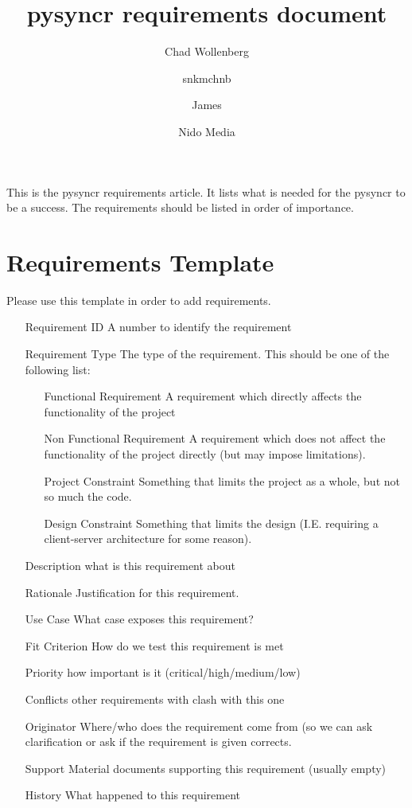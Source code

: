 \documentclass{article}
\author{Chad Wollenberg \and snkmchnb \and James \and Nido Media}
\title{pysyncr requirements document}
\begin{document}
\maketitle

\abstract

This is the pysyncr requirements article. It lists what is needed for
the pysyncr to be a success. The requirements should be listed in order
of importance.

\section{Requirements Template}

  Please use this template in order to add requirements.

  \begin{itemize}
    \item[Requirement ID] A number to identify the requirement
    \item[Requirement Type] The type of the requirement. This should be
    one of the following list:
    \begin{itemize}
      \item[Functional Requirement] A requirement which directly affects
      the functionality of the project
      \item[Non Functional Requirement] A requirement which does not
      affect the functionality of the project directly (but may impose
      limitations).
      \item[Project Constraint] Something that limits the project as a
      whole, but not so much the code.
      \item[Design Constraint] Something that limits the design (I.E.
      requiring a client-server architecture for some reason).
    \end{itemize}
    \item[Description] what is this requirement about
    \item[Rationale] Justification for this requirement.
    \item[Use Case] What case exposes this requirement?
    \item[Fit Criterion] How do we test this requirement is met
    \item[Priority] how important is it (critical/high/medium/low)
    \item[Conflicts] other requirements with clash with this one
    \item[Originator] Where/who does the requirement come from (so we can
    ask clarification or ask if the requirement is given corrects.
    \item[Support Material] documents supporting this requirement (usually empty)
    \item[History] What happened to this requirement
  \end{itemize}
\end{document}
